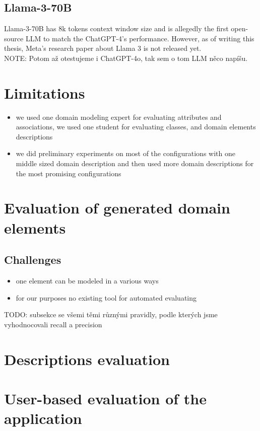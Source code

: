 \subsection{Llama-3-70B}
Llama-3-70B has 8k tokens context window size and is allegedly  the first open-source LLM to match the ChatGPT-4's performance. However, as of writing this thesis, Meta's research paper about Llama 3 is not released yet. \\

NOTE: Potom až otestujeme i ChatGPT-4o, tak sem o tom LLM něco napíšu.

\section{Limitations}
\begin{itemize}
\item we used one domain modeling expert for evaluating attributes and associations, we used one student for evaluating classes, and domain elements descriptions
\item we did preliminary experiments on most of the configurations with one middle sized domain description and then used more domain descriptions for the most promising configurations
\end{itemize}


\section{Evaluation of generated domain elements}

\subsection{Challenges}
\begin{itemize}
\item one element can be modeled in a various ways
\item for our purposes no existing tool for automated evaluating
\end{itemize}

TODO: subsekce se všemi těmi různými pravidly, podle kterých jsme vyhodnocovali recall a precision \\


\section{Descriptions evaluation}


\section{User-based evaluation of the application}

